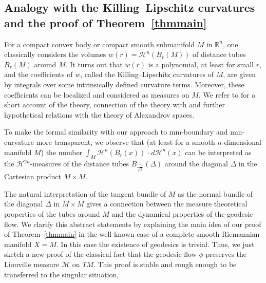 \documentclass[12pt,leqno]{amsart}
\numberwithin{equation}{section}
\theoremstyle{definition}
\theoremstyle{remark}
\newcommand{\tref}[1]{Theorem~\ref{#1}}
\newcommand{\R}{\mathbb{R}}
\def\:{\colon}
\begin{document}
\subsection{Analogy with the Killing--Lipschitz curvatures and the proof of \tref{thmmain}}
For a compact convex body or compact smooth submanifold $M$ in $\R^n$, one classically considers
the  volumes $w(r)=\mathcal H^n (B_r(M))$ of distance tubes $B_r(M)$ around $M$.
It turns out that $w(r)$ is a polynomial, at least for small $r$, and  the coefficients of
$w$, called the   Killing--Lipschitz curvatures of $M$, are given by  integrals over some intrinsically defined curvature
 terms.  Moreover, these coefficients can be localized and considered as measures on $M$. We refer  to \cite{Alesker} for a short account of the theory, connection of the theory with 
\cite{LP} and further hypothetical relations with the theory of Alexandrov spaces. 

To make the formal similarity with our approach  to mm-boundary and mm-curvature more transparent, we observe that
(at least for a smooth $n$-dimensional manifold $M$) the number   $\int _M \mathcal H^n  (B_r(x))\, \cdot  d\mathcal H^n (x)$  can be interpreted as the $\mathcal H^{2n}$-measures
of the distance tubes $B_{\frac r {\sqrt 2} } (\Delta )$ around the diagonal $\Delta $ in the Cartesian product $M\times M$.

The natural interpretation of the tangent bundle of $M$ as the normal  bundle of the diagonal $\Delta$ in $M\times M$ gives a connection between
the measure theoretical properties of the tubes around $M$ and the dynamical properties of the geodesic flow.
We clarify this abstract statements by explaining the main idea of  our  proof of \tref{thmmain} in the  well-known case of a complete smooth Riemannian manifold $X=M$.
In this case the existence of  geodesics is trivial.
Thus, we just sketch a new proof  of the  classical fact   that the geodesic flow $\phi$  preserves the Liouville measure $\mathcal M$ on $TM$.
This proof is stable and rough enough to be transferred to the singular situation,
\end{document}
